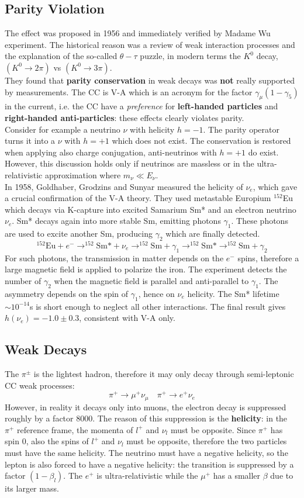 \documentclass[10.75pt,a4paper,openright,bottom=2cm]{article}
\begin{document}
\subsection{Parity Violation}
The effect was proposed in 1956 and immediately verified by Madame Wu experiment. The historical reason was a review of weak interaction processes and the explanation of the so-called $\theta-\tau$ puzzle, in modern terms the $K^0$ decay, $(K^0\to2\pi)$ vs $(K^0\to3\pi)$.\\
They found that \textbf{parity conservation} in weak decays was \textbf{not} really supported by measurements. The CC is V-A which is an acronym for the factor $\gamma_\mu(1-\gamma_5)$ in the current, i.e. the CC have a \textit{preference} for \textbf{left-handed particles} and \textbf{right-handed anti-particles}: these effects clearly violates parity.\\
Consider for example a neutrino $\nu$ with helicity $h=-1$. The parity operator turns it into a $\nu$ with $h=+1$ which does not exist. The conservation is restored when applying also charge conjugation, anti-neutrinos with $h=+1$ do exist. However, this discussion holds only if neutrinos are massless or in the ultra-relativistic approximation where $m_\nu\ll E_\nu$.\\
In 1958, Goldhaber, Grodzins and Sunyar measured the helicity of $\nu_e$, which gave a crucial confirmation of the V-A theory. They used metastable Europium $^{152}$Eu which decays via K-capture into excited Samarium Sm* and an electron neutrino $\nu_e$. Sm* decays again into more stable Sm, emitting photons $\gamma_1$. These photons are used to excite another Sm, producing $\gamma_2$ which are finally detected. 
\[
^{152}\text{Eu}+e^-\to^{152}\text{Sm*}+\nu_e\to^{152}\text{Sm}+\gamma_1\to^{152}\text{Sm*}\to^{152}\text{Sm}+\gamma_2
\]
For such photons, the transmission in matter depends on the $e^-$ spins, therefore a large magnetic field is applied to polarize the iron. The experiment detects the number of $\gamma_2$ when the magnetic field is parallel and anti-parallel to $\gamma_1$. The asymmetry depends on the spin of $\gamma_1$, hence on $\nu_e$ helicity. The Sm* lifetime $\sim10^{-14}$\;s is short enough to neglect all other interactions. The final result gives $h(\nu_e)=-1.0\pm0.3$, consistent with V-A only.
\subsection{Weak Decays}
The $\pi^\pm$ is the lightest hadron, therefore it may only decay through semi-leptonic CC weak processes:
\[
\pi^+\to\mu^+\nu_\mu \quad \pi^+\to e^+\nu_e
\]
However, in reality it decays only into muons, the electron decay is suppressed roughly by a factor 8000. The reason of this suppression is the \textbf{helicity}: in the $\pi^+$ reference frame, the momenta of $l^+$ and $\nu_l$ must be opposite. Since $\pi^+$ has spin 0, also the spins of $l^+$ and $\nu_l$ must be opposite, therefore the two particles must have the same helicity. The neutrino must have a negative helicity, so the lepton is also forced to have a negative helicity: the transition is suppressed by a factor $(1-\beta_l)$. The $e^+$ is ultra-relativistic while the $\mu^+$ has a smaller $\beta$ due to its larger mass.
\end{document}

